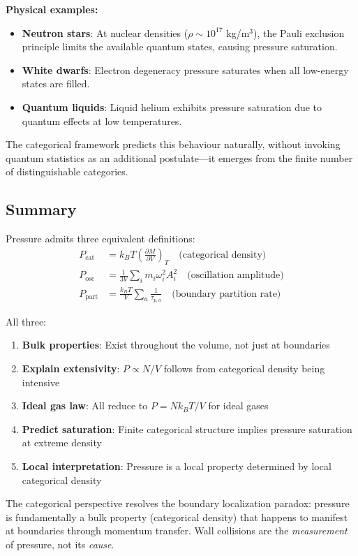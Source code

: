 \textbf{Physical examples:}
\begin{itemize}
\item \textbf{Neutron stars}: At nuclear densities ($\rho \sim 10^{17}$ kg/m$^3$), the Pauli exclusion principle limits the available quantum states, causing pressure saturation.
\item \textbf{White dwarfs}: Electron degeneracy pressure saturates when all low-energy states are filled.
\item \textbf{Quantum liquids}: Liquid helium exhibits pressure saturation due to quantum effects at low temperatures.
\end{itemize}

The categorical framework predicts this behaviour naturally, without invoking quantum statistics as an additional postulate—it emerges from the finite number of distinguishable categories.

\subsection{Summary}

Pressure admits three equivalent definitions:
\begin{align}
P_{\text{cat}} &= k_B T \left(\frac{\partial M}{\partial V}\right)_T \quad \text{(categorical density)} \\
P_{\text{osc}} &= \frac{1}{3V}\sum_i m_i \omega_i^2 A_i^2 \quad \text{(oscillation amplitude)} \\
P_{\text{part}} &= \frac{k_B T}{V} \sum_a \frac{1}{\tau_{p,a}} \quad \text{(boundary partition rate)}
\end{align}

All three:
\begin{enumerate}
\item \textbf{Bulk properties}: Exist throughout the volume, not just at boundaries
\item \textbf{Explain extensivity}: $P \propto N/V$ follows from categorical density being intensive
\item \textbf{Ideal gas law}: All reduce to $P = Nk_BT/V$ for ideal gases
\item \textbf{Predict saturation}: Finite categorical structure implies pressure saturation at extreme density
\item \textbf{Local interpretation}: Pressure is a local property determined by local categorical density
\end{enumerate}

The categorical perspective resolves the boundary localization paradox: pressure is fundamentally a bulk property (categorical density) that happens to manifest at boundaries through momentum transfer. Wall collisions are the \textit{measurement} of pressure, not its \textit{cause}.
